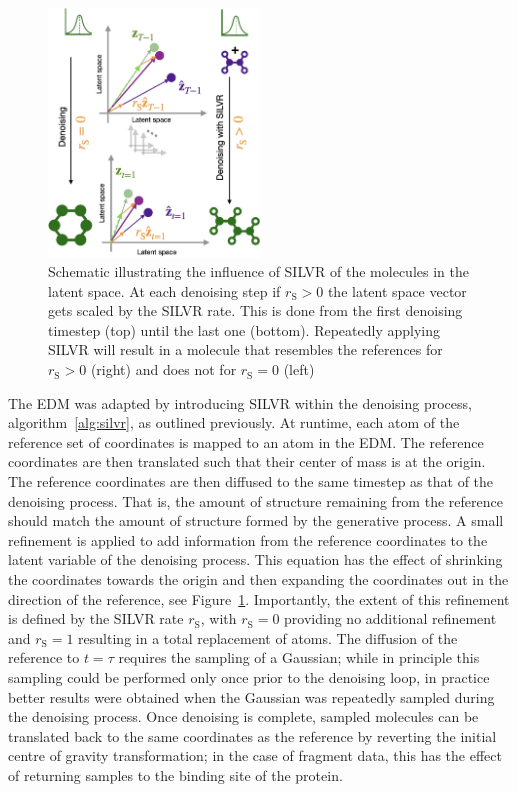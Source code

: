 \documentclass[journal=jacsat,manuscript=article]{achemso}
\begin{document}
\begin{figure}
    \centering
    \includegraphics[width=0.5\textwidth]{paper/Figures/Fig2/fig2.jpg}
    \caption{Schematic illustrating the influence of SILVR of the molecules in the latent space. At each denoising step if $r_{\mathrm{S}}>0$ the latent space vector gets scaled by the SILVR rate. This is done from the first denoising timestep (top) until the last one (bottom). Repeatedly applying SILVR will result in a molecule that resembles the references for $r_{\mathrm{S}}>0$ (right) and does not for $r_{\mathrm{S}}=0$ (left)}
    \label{fig:silvr_explanation}
\end{figure}

The EDM was adapted by introducing SILVR within the denoising process, algorithm~\ref{alg:silvr}, as outlined previously. At runtime, each atom of the reference set of coordinates is mapped to an atom in the EDM. The reference coordinates are then translated such that their center of mass is at the origin. The reference coordinates are then diffused to the same timestep as that of the denoising process. That is, the amount of structure remaining from the reference should match the amount of structure formed by the generative process. A small refinement is applied to add information from the reference coordinates to the latent variable of the denoising process. This equation has the effect of shrinking the coordinates towards the origin and then expanding the coordinates out in the direction of the reference, see Figure~\ref{fig:silvr_explanation}. Importantly, the extent of this refinement is defined by the SILVR rate $r_{\mathrm{S}}$, with $r_{\mathrm{S}}=0$ providing no additional refinement and $r_{\mathrm{S}}=1$ resulting in a total replacement of atoms. The diffusion of the reference to $t=\tau$ requires the sampling of a Gaussian; while in principle this sampling could be performed only once prior to the denoising loop, in practice better results were obtained when the Gaussian was repeatedly sampled during the denoising process. Once denoising is complete, sampled molecules can be translated back to the same coordinates as the reference by reverting the initial centre of gravity transformation; in the case of fragment data, this has the effect of returning samples to the binding site of the protein.
\end{document}
